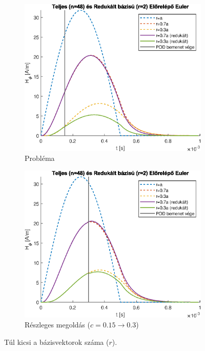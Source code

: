         \begin{figure}[h]
            \centering
            \begin{subfigure}{0.48\textwidth}
                \includegraphics[width=\textwidth]{kep/euler_0.15_2_td.eps}
                \caption{Probléma}
                \label{subfig:keves_vektor_rossz}
            \end{subfigure}
            \begin{subfigure}{0.48\textwidth}
                \includegraphics[width=\textwidth]{kep/euler_0.3_2_td.eps}
                \caption{Részleges megoldás ($c=0.15 \rightarrow 0.3$)}
                \label{subfig:keves_vektor_jo}
            \end{subfigure}
            \caption{Túl kicsi a bázisvektorok száma ($r$).}
            \label{fig:keves_vektor}
        \end{figure}
